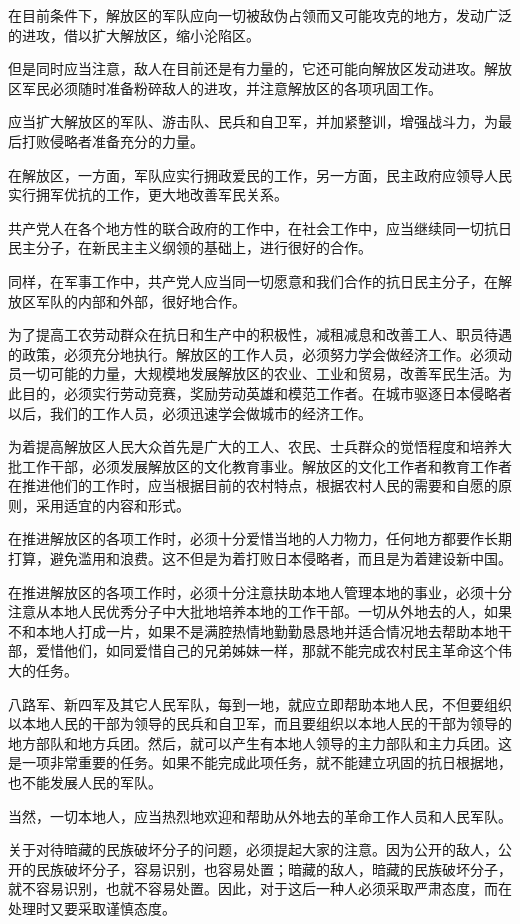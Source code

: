 在目前条件下，解放区的军队应向一切被敌伪占领而又可能攻克的地方，发动广泛的进攻，借以扩大解放区，缩小沦陷区。

但是同时应当注意，敌人在目前还是有力量的，它还可能向解放区发动进攻。解放区军民必须随时准备粉碎敌人的进攻，并注意解放区的各项巩固工作。

应当扩大解放区的军队、游击队、民兵和自卫军，并加紧整训，增强战斗力，为最后打败侵略者准备充分的力量。

在解放区，一方面，军队应实行拥政爱民的工作，另一方面，民主政府应领导人民实行拥军优抗的工作，更大地改善军民关系。

共产党人在各个地方性的联合政府的工作中，在社会工作中，应当继续同一切抗日民主分子，在新民主主义纲领的基础上，进行很好的合作。

同样，在军事工作中，共产党人应当同一切愿意和我们合作的抗日民主分子，在解放区军队的内部和外部，很好地合作。

为了提高工农劳动群众在抗日和生产中的积极性，减租减息和改善工人、职员待遇的政策，必须充分地执行。解放区的工作人员，必须努力学会做经济工作。必须动员一切可能的力量，大规模地发展解放区的农业、工业和贸易，改善军民生活。为此目的，必须实行劳动竞赛，奖励劳动英雄和模范工作者。在城市驱逐日本侵略者以后，我们的工作人员，必须迅速学会做城市的经济工作。

为着提高解放区人民大众首先是广大的工人、农民、士兵群众的觉悟程度和培养大批工作干部，必须发展解放区的文化教育事业。解放区的文化工作者和教育工作者在推进他们的工作时，应当根据目前的农村特点，根据农村人民的需要和自愿的原则，采用适宜的内容和形式。

在推进解放区的各项工作时，必须十分爱惜当地的人力物力，任何地方都要作长期打算，避免滥用和浪费。这不但是为着打败日本侵略者，而且是为着建设新中国。

在推进解放区的各项工作时，必须十分注意扶助本地人管理本地的事业，必须十分注意从本地人民优秀分子中大批地培养本地的工作干部。一切从外地去的人，如果不和本地人打成一片，如果不是满腔热情地勤勤恳恳地并适合情况地去帮助本地干部，爱惜他们，如同爱惜自己的兄弟姊妹一样，那就不能完成农村民主革命这个伟大的任务。

八路军、新四军及其它人民军队，每到一地，就应立即帮助本地人民，不但要组织以本地人民的干部为领导的民兵和自卫军，而且要组织以本地人民的干部为领导的地方部队和地方兵团。然后，就可以产生有本地人领导的主力部队和主力兵团。这是一项非常重要的任务。如果不能完成此项任务，就不能建立巩固的抗日根据地，也不能发展人民的军队。

当然，一切本地人，应当热烈地欢迎和帮助从外地去的革命工作人员和人民军队。

关于对待暗藏的民族破坏分子的问题，必须提起大家的注意。因为公开的敌人，公开的民族破坏分子，容易识别，也容易处置；暗藏的敌人，暗藏的民族破坏分子，就不容易识别，也就不容易处置。因此，对于这后一种人必须采取严肃态度，而在处理时又要采取谨慎态度。

